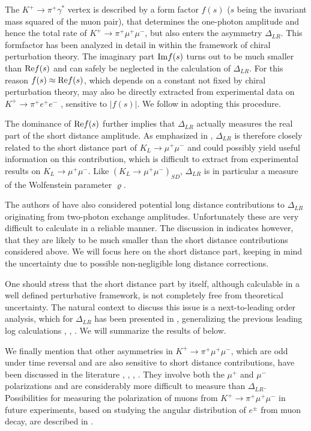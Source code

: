 The $K^+\to\pi^+\gamma^\ast$ vertex is described by a form factor
$f(s)$ ($s$ being the invariant mass squared of the muon pair), that
determines the one-photon amplitude and hence the total rate of
$K^+\to\pi^+\mu^+\mu^-$, but also enters the asymmetry $\Delta_{LR}$.
This formfactor has been analyzed in detail in \cite{eckeretal:87}
within the framework of chiral perturbation theory. The imaginary part
${\rm Im} f(s)$ turns out to be much smaller than ${{\rm Re}} f(s)$ and can
safely be neglected in the calculation of $\Delta_{LR}$. For this
reason $f(s)\approx {{\rm Re}} f(s)$, which depends on a constant not fixed
by chiral perturbation theory, may also be directly extracted from
experimental data on $K^+\to\pi^+e^+e^-$ \cite{alliegro:92}, sensitive
to $|f(s)|$. We follow \cite{luetal:92} in adopting this procedure.

The dominance of ${{\rm Re}} f(s)$ further implies that $\Delta_{LR}$
actually measures the real part of the short distance amplitude.  As
emphasized in \cite{belangeretal:93}, $\Delta_{LR}$ is therefore
closely related to the short distance part of $K_L\to\mu^+\mu^-$ and
could possibly yield useful information on this contribution, which is
difficult to extract from experimental results on $K_L\to\mu^+\mu^-$.
Like $(K_L\to\mu^+\mu^-)_{SD}$, $\Delta_{LR}$ is in particular a
measure of the Wolfenstein parameter $\varrho$.

The authors of \cite{luetal:92} have also considered potential long
distance contributions to $\Delta_{LR}$ originating from two-photon
exchange amplitudes. Unfortunately these are very difficult to
calculate in a reliable manner. The discussion in \cite{luetal:92}
indicates however, that they are likely to be much smaller than the
short distance contributions considered above. We will focus here on
the short distance part, keeping in mind the uncertainty due to
possible non-negligible long distance corrections.

One should stress that the short distance part by itself, although
calculable in a well defined perturbative framework, is not completely
free from theoretical uncertainty. The natural context to discuss this
issue is a next-to-leading order analysis, which for $\Delta_{LR}$ has
been presented in \cite{buchallaburas:94b}, generalizing the previous
leading log calculations \cite{savagewise:90}, \cite{luetal:92},
\cite{belangeretal:93}. We will summarize the results of
\cite{buchallaburas:94b} below.

We finally mention that other asymmetries in $K^+\to\pi^+\mu^+\mu^-$,
which are odd under time reversal and are also sensitive to short
distance contributions, have been discussed in the literature
\cite{savagewise:90}, \cite{luetal:92}, \cite{agrawaletal:91},
\cite{agrawaletal:92}. They involve both the $\mu^+$ and $\mu^-$
polarizations and are considerably more difficult to measure than
$\Delta_{LR}$. Possibilities for measuring the polarization of muons
from $K^+\to\pi^+\mu^+\mu^-$ in future experiments, based on studying
the angular distribution of $e^\pm$ from muon decay, are described in
\cite{kuno:92}.

